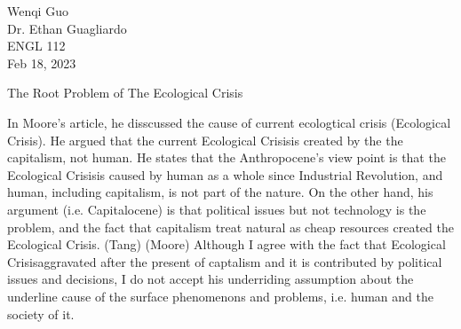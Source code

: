 \documentclass[12pt]{article}
\newcommand{\EC}{Ecological Crisis}
\begin{document}
\begin{flushleft}

Wenqi Guo\\
Dr. Ethan Guagliardo\\
ENGL 112\\
Feb 18, 2023\\

\begin{center}
The Root Problem of The Ecological Crisis
\end{center}



\setlength{\parindent}{0.5in}


In Moore's article, he disscussed the cause of current ecologtical crisis (\EC). He argued that the current \EC is created by the the capitalism, not human. He states that the Anthropocene’s view point is that the \EC is caused by human as a whole since Industrial Revolution, and human, including capitalism, is not part of the nature. On the other hand, his argument (i.e. Capitalocene) is that political issues but not technology is the problem, and the fact that capitalism treat natural as cheap resources created the \EC. (Tang) (Moore)
Although I agree with the fact that \EC aggravated after the present of captalism and it is contributed by political issues and decisions, I do not accept his underriding assumption about the underline cause of the surface phenomenons and problems, i.e. human and the society of it.


\end{flushleft}
\end{document}
